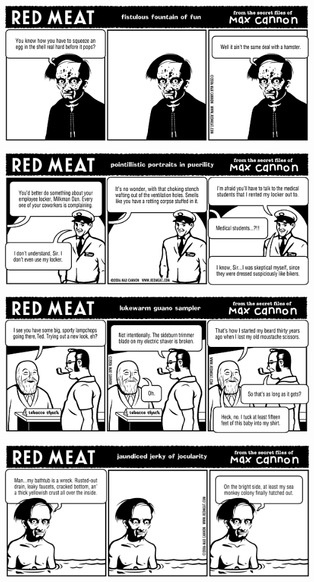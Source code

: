 \documentclass[a4paper,twoside,11pt]{article}
\begin{document}
\includegraphics[width=\textwidth]{redmeat_2006-09-26.png}



\includegraphics[width=\textwidth]{redmeat_2006-10-03.png}



\includegraphics[width=\textwidth]{redmeat_2006-10-10.png}



\includegraphics[width=\textwidth]{redmeat_2006-10-17.png}
\end{document}

